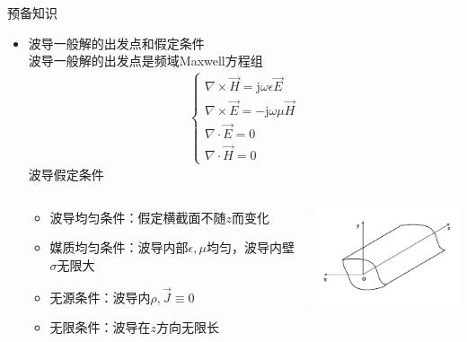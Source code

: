 \begin{frame}{预备知识}
    \begin{itemize}
        \item 波导一般解的出发点和假定条件\\
              波导一般解的出发点是频域Maxwell方程组
              \begin{align}
                  \begin{cases}
                      \nabla\times\vec{H}=\mathrm{j}\omega\epsilon\vec{E} \\
                      \nabla\times\vec{E}=-\mathrm{j}\omega\mu\vec{H}     \\
                      \nabla\cdot\vec{E}=0                                \\
                      \nabla\cdot\vec{H}=0
                  \end{cases}
                  \label{eqn6-1}
              \end{align}
              波导假定条件
              \begin{columns}
                  \begin{column}{0.5\linewidth}
                      \begin{itemize}
                          \item 波导均匀条件：假定横截面不随$z$而变化
                          \item 媒质均匀条件：波导内部$\epsilon,\mu$均匀，波导内壁$\sigma$无限大
                          \item 无源条件：波导内$\rho,\vec{J}\equiv 0$
                          \item 无限条件：波导在$z$方向无限长
                      \end{itemize}
                  \end{column}
                  \begin{column}{0.5\linewidth}
                      \includegraphics[width=5cm]{Cha6//fig6-1.pdf}
                  \end{column}
              \end{columns}
    \end{itemize}
\end{frame}

